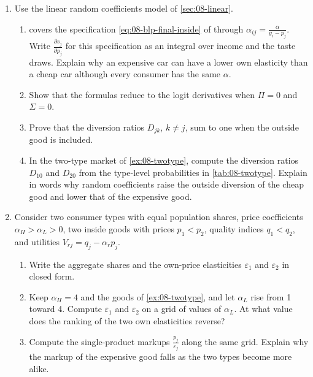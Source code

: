 \begin{enumerate}[label=\arabic*., leftmargin=*, itemsep=6pt]

\item Use the linear random coefficients model of \cref{sec:08-linear}.
\begin{enumerate}[label=(\alph*)]
  \item {} covers the specification \eqref{eq:08-blp-final-inside} of
  \citet{BerryLevinsohnPakes1995} through $\alpha_{ij} = \frac{\alpha}{y_i - p_j}$. Write
  $\frac{\partial s_j}{\partial p_j}$ for this specification as an integral over income and the taste draws.
  Explain why an expensive car can have a lower own elasticity than a cheap car although every consumer has the
  same $\alpha$.
  \item Show that the formulas reduce to the logit derivatives when $\Pi = 0$ and $\Sigma = 0$.
  \item Prove that the diversion ratios $D_{jk}$, $k \neq j$, sum to one when the outside good is included.
  \item In the two-type market of \cref{ex:08-twotype}, compute the diversion ratios $D_{10}$ and $D_{20}$ from
  the type-level probabilities in \cref{tab:08-twotype}. Explain in words why random coefficients raise the
  outside diversion of the cheap good and lower that of the expensive good.
\end{enumerate}

\item Consider two consumer types with equal population shares, price coefficients $\alpha_H > \alpha_L > 0$, two
inside goods with prices $p_1 < p_2$, quality indices $q_1 < q_2$, and utilities $V_{rj} = q_j - \alpha_r p_j$.
\begin{enumerate}[label=(\alph*)]
  \item Write the aggregate shares and the own-price elasticities $\varepsilon_1$ and $\varepsilon_2$ in closed
  form.
  \item Keep $\alpha_H = 4$ and the goods of \cref{ex:08-twotype}, and let $\alpha_L$ rise from 1 toward 4. Compute
  $\varepsilon_1$ and $\varepsilon_2$ on a grid of values of $\alpha_L$. At what value does the ranking of
  the two own elasticities reverse?
  \item Compute the single-product markups $\frac{p_j}{\varepsilon_j}$ along the same grid. Explain why the
  markup of the expensive good falls as the two types become more alike.
\end{enumerate}


\end{enumerate}
